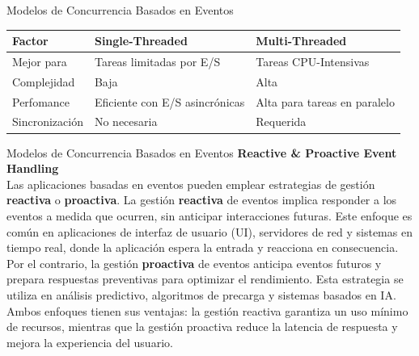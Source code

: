 \documentclass[11pt]{beamer}
\begin{document}
	\begin{frame}{Modelos de Concurrencia Basados en Eventos}
	\small
	\begin{table}
	\centering
	\renewcommand{\arraystretch}{1.2}
	\begin{tabular}{|p{3cm}|p{4cm}|p{4cm}|}
	\hline
	\cellcolor{blue!15}\textbf{Factor} & \cellcolor{blue!15}\textbf{Single-Threaded} & \cellcolor{blue!15}\textbf{Multi-Threaded} \\ \hline
	\cellcolor{blue!15}Mejor para & Tareas limitadas por E/S &  Tareas CPU-Intensivas \\ \hline
	\cellcolor{blue!15}Complejidad & Baja & Alta \\ \hline
	\cellcolor{blue!15}Perfomance & Eficiente con E/S asincrónicas & Alta para tareas en paralelo \\ \hline
	\cellcolor{blue!15}Sincronización & No necesaria & Requerida \\ \hline
	\end{tabular}
	\end{table}
	\end{frame}
	
	\begin{frame}{Modelos de Concurrencia Basados en Eventos}
	\textbf{Reactive \& Proactive Event Handling} \\
	\vspace{0.4cm}
	\justifying \small
	Las aplicaciones basadas en eventos pueden emplear estrategias de gestión \textbf{reactiva} o \textbf{proactiva}. La gestión \textbf{reactiva} de eventos implica responder a los eventos a medida que ocurren, sin anticipar interacciones futuras. Este enfoque es común en aplicaciones de interfaz de usuario (UI), servidores de red y sistemas en tiempo real, donde la aplicación espera la entrada y reacciona en consecuencia. \\ 
	Por el contrario, la gestión \textbf{proactiva} de eventos anticipa eventos futuros y prepara respuestas preventivas para optimizar el rendimiento. 
	Esta estrategia se utiliza en análisis predictivo, algoritmos de precarga y sistemas basados en IA.\\
	Ambos enfoques tienen sus ventajas: la gestión reactiva garantiza un uso mínimo de recursos, mientras que la gestión proactiva reduce la latencia de respuesta y mejora la experiencia del usuario.
	\end{frame}
	
\end{document}
